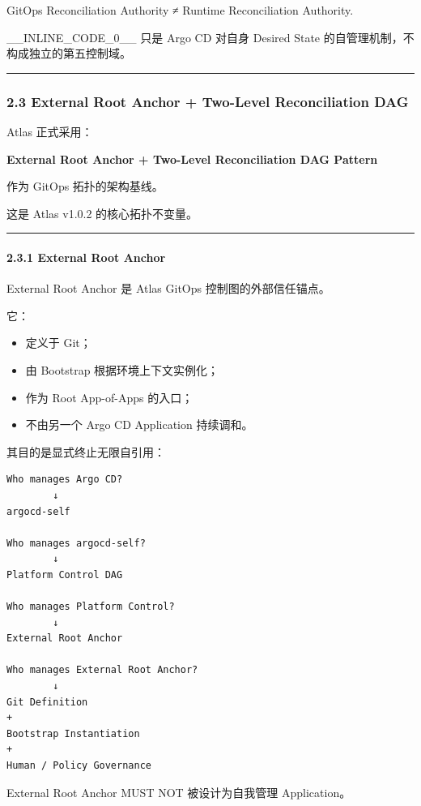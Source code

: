 \documentclass[11pt,a4paper]{article}
\begin{document}
\begin{gfmBlockquote}
GitOps Reconciliation Authority ≠ Runtime Reconciliation Authority.
\end{gfmBlockquote}
\_\_INLINE\_CODE\_0\_\_ 只是 Argo CD 对自身 Desired State 的自管理机制，不构成独立的第五控制域。

\vspace{0.5em}\hrule\vspace{0.5em}
\subsubsection{2.3 External Root Anchor + Two-Level Reconciliation DAG}
Atlas 正式采用：

\begin{gfmBlockquote}
\textbf{External Root Anchor + Two-Level Reconciliation DAG Pattern}
\end{gfmBlockquote}
作为 GitOps 拓扑的架构基线。

这是 Atlas v1.0.2 的核心拓扑不变量。

\vspace{0.5em}\hrule\vspace{0.5em}
\paragraph{2.3.1 External Root Anchor}
External Root Anchor 是 Atlas GitOps 控制图的外部信任锚点。

它：

\begin{itemize}
  \item 定义于 Git；
  \item 由 Bootstrap 根据环境上下文实例化；
  \item 作为 Root App-of-Apps 的入口；
  \item 不由另一个 Argo CD Application 持续调和。
\end{itemize}
其目的是显式终止无限自引用：

\begin{lstlisting}[language=text]
Who manages Argo CD?
        ↓
argocd-self

Who manages argocd-self?
        ↓
Platform Control DAG

Who manages Platform Control?
        ↓
External Root Anchor

Who manages External Root Anchor?
        ↓
Git Definition
+
Bootstrap Instantiation
+
Human / Policy Governance
\end{lstlisting}
External Root Anchor MUST NOT 被设计为自我管理 Application。
\end{document}

